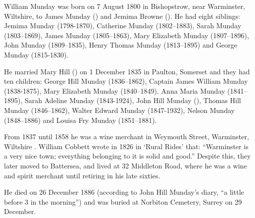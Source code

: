 
William Munday was born on 7 August 1800 \cite{WillMundayBirth} in Bishopstrow, near Warminster, Wiltshire, to James Munday () and Jemima Browne ().  He had eight siblings:  Jemima Munday (1798-1870), Catherine Munday (1802--1883), Sarah Munday (1803--1869), James Munday (1805--1863), Mary Elizabeth Munday (1807--1896), John Munday (1809--1835), Henry Thomas Munday (1813--1895) and George Munday (1815-1830).

He married Mary Hill () on 1 December 1835 in Paulton, Somerset and they had ten children:  George Hill Munday (1836--1862), Captain James William Munday (1838-1875), Mary Elizabeth Munday (1840--1849), Anna Maria Munday (1841--1895), Sarah Adeline Munday (1843-1924), John Hill Munday (), Thomas Hill Munday (1846--1862), Walter Edward Munday (1847-1932), Nelson Munday (1848--1886) and Louisa Fry Munday (1851--1881).

From 1837 until 1858 he was a wine merchant in Weymouth Street, Warminster, Wiltshire \cite{WillMundayOccupation}. William Cobbett wrote in 1826 in `Rural Rides' that: ``Warminster is a very nice town; everything belonging to it is solid and good.'' Despite this, they later moved to Battersea, and lived at 32 Middleton Road, where he was a wine and spirit merchant until retiring in his late sixties.\cite{WillMundayBattersea}

He died on 26 December 1886 (according to John Hill Munday's diary, ``a little before 3 in the morning'') and was buried at Norbiton Cemetery, Surrey on 29 December.\cite{WillMundayDeath}
